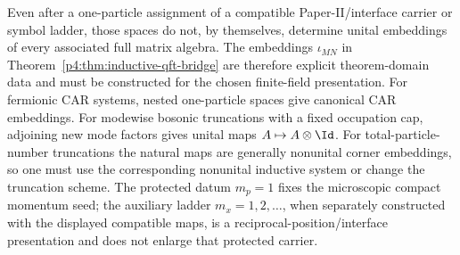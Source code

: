 \documentclass[12pt,a4paper]{article}
\begin{document}
\begin{remark}[Embedding compatibility and the role of \texorpdfstring{$m=1$}{m=1}]
\label{p4:rem:truncation-compatibility}
Even after a one-particle assignment of a compatible Paper-II/interface
carrier or symbol ladder, those spaces do not, by themselves, determine
unital embeddings of every associated full matrix algebra.  The embeddings
\(\iota_{MN}\) in Theorem~\ref{p4:thm:inductive-qft-bridge} are therefore explicit
theorem-domain data and must be constructed for the chosen finite-field presentation.
For fermionic CAR systems, nested one-particle spaces give canonical CAR embeddings.
For modewise bosonic truncations with a fixed occupation cap, adjoining new mode
factors gives unital maps \(A\mapsto A\otimes\Id\).  For total-particle-number
truncations the natural maps are generally nonunital corner embeddings, so one must
use the corresponding nonunital inductive system or change the truncation scheme.
The protected datum \(m_p=1\) fixes the microscopic compact momentum seed; the
auxiliary ladder \(m_x=1,2,\ldots\), when separately constructed with the
displayed compatible maps, is a reciprocal-position/interface presentation
and does not enlarge that protected carrier.
\end{remark}
\end{document}
